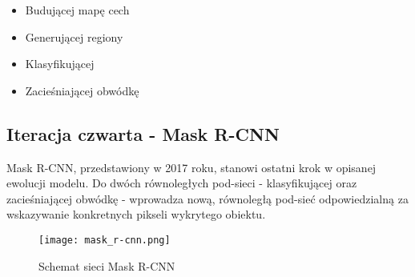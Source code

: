 \begin{itemize}
	\item Budującej mapę cech
	\item Generującej regiony
	\item Klasyfikującej
	\item Zacieśniającej obwódkę
\end{itemize}

\subsection{Iteracja czwarta - Mask R-CNN}

Mask R-CNN, przedstawiony w 2017 roku, stanowi ostatni krok w opisanej ewolucji modelu. Do dwóch równoległych pod-sieci - klasyfikującej oraz zacieśniającej obwódkę - wprowadza nową, równoległą pod-sieć odpowiedzialną za wskazywanie konkretnych pikseli wykrytego obiektu.

\begin{figure}[H]
  \centering
  \caption{Schemat sieci Mask R-CNN}
  \texttt{[image: mask\_r-cnn.png]}
\end{figure}

